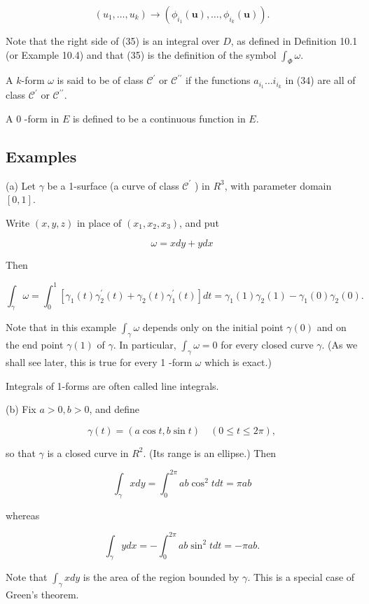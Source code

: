 \documentclass[10pt]{article}
\begin{document}
$$
\left(u_{1}, \ldots, u_{k}\right) \rightarrow\left(\phi_{i_{1}}(\mathbf{u}), \ldots, \phi_{i_{k}}(\mathbf{u})\right) .
$$

Note that the right side of (35) is an integral over $D$, as defined in Definition 10.1 (or Example 10.4) and that (35) is the definition of the symbol $\int_{\Phi} \omega$.

A $k$-form $\omega$ is said to be of class $\mathscr{C}^{\prime}$ or $\mathscr{C}^{\prime \prime}$ if the functions $a_{i_{1}} \ldots i_{i_{k}}$ in (34) are all of class $\mathscr{C}^{\prime}$ or $\mathscr{C}^{\prime \prime}$.

A 0 -form in $E$ is defined to be a continuous function in $E$.

\subsection{Examples}
(a) Let $\gamma$ be a 1-surface (a curve of class $\mathscr{C}^{\prime}$ ) in $R^{3}$, with parameter domain $[0,1]$.

Write $(x, y, z)$ in place of $\left(x_{1}, x_{2}, x_{3}\right)$, and put

$$
\omega=x d y+y d x
$$

Then

$$
\int_{\gamma} \omega=\int_{0}^{1}\left[\gamma_{1}(t) \gamma_{2}^{\prime}(t)+\gamma_{2}(t) \gamma_{1}^{\prime}(t)\right] d t=\gamma_{1}(1) \gamma_{2}(1)-\gamma_{1}(0) \gamma_{2}(0) .
$$

Note that in this example $\int_{\gamma} \omega$ depends only on the initial point $\gamma(0)$ and on the end point $\gamma(1)$ of $\gamma$. In particular, $\int_{\gamma} \omega=0$ for every closed curve $\gamma$. (As we shall see later, this is true for every 1 -form $\omega$ which is exact.)

Integrals of 1-forms are often called line integrals.

(b) Fix $a>0, b>0$, and define

$$
\gamma(t)=(a \cos t, b \sin t) \quad(0 \leq t \leq 2 \pi),
$$

so that $\gamma$ is a closed curve in $R^{2}$. (Its range is an ellipse.) Then

$$
\int_{\gamma} x d y=\int_{0}^{2 \pi} a b \cos ^{2} t d t=\pi a b
$$

whereas

$$
\int_{\gamma} y d x=-\int_{0}^{2 \pi} a b \sin ^{2} t d t=-\pi a b .
$$

Note that $\int_{\gamma} x d y$ is the area of the region bounded by $\gamma$. This is a special case of Green's theorem.
\end{document}
